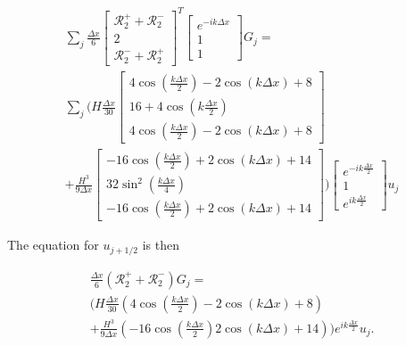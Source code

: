 \documentclass[12pt]{article}
\begin{document}
\begin{multline}
\sum_j \frac{\Delta x}{6} \begin{bmatrix}  \mathcal{R}^+_2 +  \mathcal{R}^-_2   \\2 \\ \mathcal{R}^-_2 + \mathcal{R}^+_2 \end{bmatrix}^T \begin{bmatrix} e^{-ik\Delta x} \\ 1 \\ 1\end{bmatrix} G_j = \\\sum_j \Bigg(H\frac{\Delta x}{30}\begin{bmatrix}4\cos\left(\frac{k\Delta x}{2}\right) -2 \cos\left(k \Delta x\right)+8\\16 + 4 \cos\left(k \frac{\Delta x}{2}\right) \\4\cos\left(\frac{k\Delta x}{2}\right) -2 \cos\left(k \Delta x\right)+8\end{bmatrix} \\+ \frac{H^3 }{9\Delta x}\begin{bmatrix} -16\cos\left(\frac{k\Delta x}{2}\right) + 2\cos\left(k \Delta x\right) + 14 \\ 32 \sin^2 \left(\frac{k \Delta x}{4}\right) \\-16\cos\left(\frac{k\Delta x}{2}\right) + 2\cos\left(k \Delta x\right) + 14 \end{bmatrix}  \Bigg) \begin{bmatrix} e^{-ik\frac{\Delta x}{2}} \\ 1 \\ e^{ik\frac{\Delta x}{2}} \end{bmatrix}  u_j
\end{multline}

The equation for $u_{j+1/2}$ is then

\begin{multline}
\frac{\Delta x}{6}\left(\mathcal{R}^+_2 +\mathcal{R}^-_2\right)  G_j = \\ \Bigg(H\frac{\Delta x}{30} \left(4\cos\left(\frac{k\Delta x}{2}\right) -2 \cos\left(k \Delta x\right) + 8 \right) \\+ \frac{H^3 }{9\Delta x}\left(-16\cos\left(\frac{k\Delta x}{2}\right) 2 \cos\left(k \Delta x\right) + 14 \right)   \Bigg)  e^{ik\frac{\Delta x}{2}} u_j. 
\end{multline}
\end{document}
